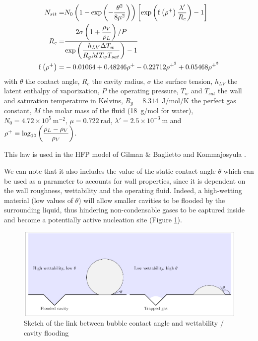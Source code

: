 \begin{align}
N_{sit} =& N_{0}\parth{1-\exp{-\dfrac{\theta^{2}}{8\mu^{2}} } }\crocht{\exp{ \mathrm{f}\parth{\rho^{+}}\dfrac{\lambda '}{R_{c}} } -1}
\label{eq:nsit_hibiki} \\
%
R_{c} =& \dfrac{2\sigma\parth{1+\dfrac{\rho_{V}}{\rho_{L}}} / P }{\exp{\dfrac{h_{LV} \Delta T_{w}}{R_{g} M T_{w}T_{sat}} } -1}\\
%
\mathrm{f}\parth{\rho^{+}} =& -0.01064 + 0.48246\rho^{+} - 0.22712 \rho^{+^{2}} + 0.05468 \rho^{+^{3}}
\end{align}
with $\theta$ the contact angle, $R_{c}$ the cavity radius, $\sigma$ the surface tension, $h_{LV}$ the latent enthalpy of vaporization, $P$ the operating pressure, $T_{w}$ and $T_{sat}$ the wall and saturation temperature in Kelvins, $R_{g}=8.314$~J/mol/K the perfect gas constant, $M$ the molar mass of the fluid (18~g/mol for water),  $N_{0}=4.72\times 10^{5}\ \mathrm{m}^{-2}$, $\mu = 0.722\ \mathrm{rad}$, $\lambda ' = 2.5 \times 10^{-3} \ \mathrm{m}$ and $\rho^{+}=\mathrm{log}_{10}\left( \dfrac{\rho_{L}-\rho_{V}}{\rho_{V}} \right)$.


\begin{note*}{}
This law is used in the HFP model of Gilman \& Baglietto \cite{gilman_self-consistent_2017} and Kommajosyula \cite{kommajosyula_development_2020}.
\end{note*}

We can note that it also includes the value of the static contact angle $\theta$ which can be used as a parameter to accounts for wall properties, since it is dependent on the wall roughness, wettability and the operating fluid.  Indeed, a high-wetting material (low values of $\theta$) will allow smaller cavities to be flooded by the surrounding liquid, thus hindering non-condensable gases to be captured inside and become a potentially active nucleation site (Figure \ref{fig:nsd_theta_wet}).

\begin{figure}[h!]
\centering
\includegraphics[scale=0.8]{img/NSD/wettability.pdf}
\caption{Sketch of the link between bubble contact angle and wettability / cavity flooding}
\label{fig:nsd_theta_wet}
\end{figure}

